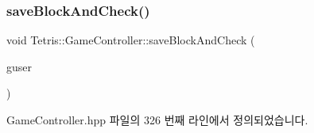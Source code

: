 \mbox{\label{class_tetris_1_1_game_controller_a3c63a9754e4cbeae4f66a5760bb4055d}} 
\subsubsection{\texorpdfstring{save\+Block\+And\+Check()}{saveBlockAndCheck()}\hspace{0.1cm}{\footnotesize\ttfamily [2/2]}}
{\footnotesize\ttfamily void Tetris\+::\+Game\+Controller\+::save\+Block\+And\+Check (\begin{DoxyParamCaption}\item[{\hyperlink{class_tetris_1_1_users_1_1_game_user}{Users\+::\+Game\+User} $\ast$}]{guser }\end{DoxyParamCaption})\hspace{0.3cm}{\ttfamily [inline]}}



Game\+Controller.\+hpp 파일의 326 번째 라인에서 정의되었습니다.


